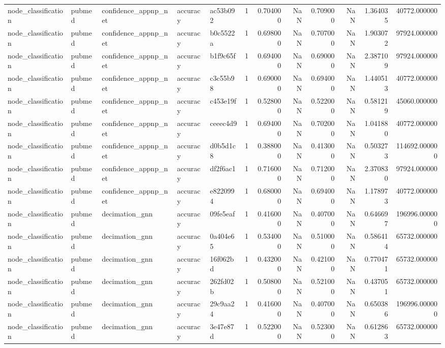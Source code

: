 \begin{tabular}{lllllrrrrrrr}
node_classification & pubmed & confidence_appnp_net & accuracy & ac53b092 & 1 & 0.704000 & NaN & 0.709000 & NaN & 1.364035 & 40772.000000 \\
node_classification & pubmed & confidence_appnp_net & accuracy & b0c5522a & 1 & 0.698000 & NaN & 0.707000 & NaN & 1.903072 & 97924.000000 \\
node_classification & pubmed & confidence_appnp_net & accuracy & b1f9c65f & 1 & 0.694000 & NaN & 0.690000 & NaN & 2.387109 & 97924.000000 \\
node_classification & pubmed & confidence_appnp_net & accuracy & c3c55b98 & 1 & 0.690000 & NaN & 0.694000 & NaN & 1.440513 & 40772.000000 \\
node_classification & pubmed & confidence_appnp_net & accuracy & c453e19f & 1 & 0.528000 & NaN & 0.522000 & NaN & 0.581219 & 45060.000000 \\
node_classification & pubmed & confidence_appnp_net & accuracy & ceeec4d9 & 1 & 0.694000 & NaN & 0.702000 & NaN & 1.041880 & 40772.000000 \\
node_classification & pubmed & confidence_appnp_net & accuracy & d0b5d1c8 & 1 & 0.388000 & NaN & 0.413000 & NaN & 0.503273 & 114692.000000 \\
node_classification & pubmed & confidence_appnp_net & accuracy & df2f6ac1 & 1 & 0.716000 & NaN & 0.712000 & NaN & 2.370830 & 97924.000000 \\
node_classification & pubmed & confidence_appnp_net & accuracy & e8220994 & 1 & 0.680000 & NaN & 0.694000 & NaN & 1.178973 & 40772.000000 \\
node_classification & pubmed & decimation_gnn & accuracy & 09fe5eaf & 1 & 0.416000 & NaN & 0.407000 & NaN & 0.646697 & 196996.000000 \\
node_classification & pubmed & decimation_gnn & accuracy & 0a404e65 & 1 & 0.534000 & NaN & 0.510000 & NaN & 0.586414 & 65732.000000 \\
node_classification & pubmed & decimation_gnn & accuracy & 16f062bd & 1 & 0.432000 & NaN & 0.421000 & NaN & 0.770471 & 65732.000000 \\
node_classification & pubmed & decimation_gnn & accuracy & 262fd02b & 1 & 0.508000 & NaN & 0.521000 & NaN & 0.437051 & 65732.000000 \\
node_classification & pubmed & decimation_gnn & accuracy & 29c9aa24 & 1 & 0.416000 & NaN & 0.407000 & NaN & 0.650386 & 196996.000000 \\
node_classification & pubmed & decimation_gnn & accuracy & 3e47e87d & 1 & 0.522000 & NaN & 0.523000 & NaN & 0.612863 & 65732.000000 \\

\end{tabular}

